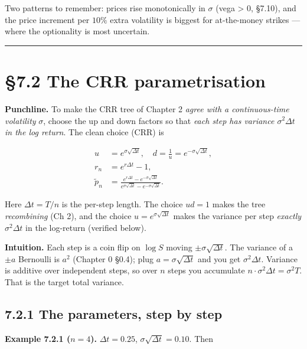 \documentclass[
  10pt,
  twoside]{book}
\begin{document}
Two patterns to remember: prices rise monotonically in \(\sigma\) (vega
\textgreater{} 0, §7.10), and the price increment per \(10\%\) extra
volatility is biggest for at-the-money strikes --- where the optionality
is most uncertain.

\begin{center}\rule{0.5\linewidth}{0.5pt}\end{center}

\section{§7.2 The CRR parametrisation}\label{the-crr-parametrisation}

\textbf{Punchline.} To make the CRR tree of Chapter 2 \emph{agree with a
continuous-time volatility} \(\sigma\), choose the up and down factors
so that \emph{each step has variance \(\sigma^2 \Delta t\) in the log
return}. The clean choice (CRR) is

\[\boxed{\;\begin{aligned}
u &= e^{\sigma\sqrt{\Delta t}}, \quad d = \tfrac{1}{u} = e^{-\sigma\sqrt{\Delta t}}, \\
r_n &= e^{r\Delta t} - 1, \\
\tilde p_n &= \frac{e^{r\Delta t} - e^{-\sigma\sqrt{\Delta t}}}{e^{\sigma\sqrt{\Delta t}} - e^{-\sigma\sqrt{\Delta t}}}.
\end{aligned}\;}\]

Here \(\Delta t = T/n\) is the per-step length. The choice \(ud = 1\)
makes the tree \emph{recombining} (Ch 2), and the choice
\(u = e^{\sigma\sqrt{\Delta t}}\) makes the variance per step
\emph{exactly} \(\sigma^2 \Delta t\) in the log-return (verified below).

\textbf{Intuition.} Each step is a coin flip on \(\log S\) moving
\(\pm \sigma\sqrt{\Delta t}\). The variance of a \(\pm a\) Bernoulli is
\(a^2\) (Chapter 0 §0.4); plug \(a = \sigma\sqrt{\Delta t}\) and you get
\(\sigma^2 \Delta t\). Variance is additive over independent steps, so
over \(n\) steps you accumulate
\(n \cdot \sigma^2 \Delta t = \sigma^2 T\). That is the target total
variance.

\subsection{7.2.1 The parameters, step by
step}\label{the-parameters-step-by-step}

\textbf{Example 7.2.1 (\(n=4\)).} \(\Delta t = 0.25\),
\(\sigma\sqrt{\Delta t} = 0.10\). Then
\end{document}
